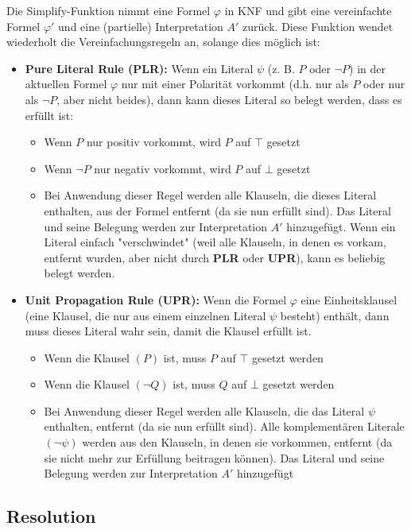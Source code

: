 \documentclass{panikzettel}
\begin{document}
Die Simplify-Funktion nimmt eine Formel $\varphi$ in KNF und gibt eine vereinfachte Formel $\varphi'$ und eine (partielle) Interpretation $A'$ zurück. Diese Funktion wendet wiederholt die Vereinfachungsregeln an, solange dies möglich ist:
\begin{itemize}
  \item \textbf{Pure Literal Rule (PLR):} Wenn ein Literal $\psi$ (z. B. $P$ oder $\neg P$) in der aktuellen Formel $\varphi$ nur mit einer Polarität vorkommt (d.h. nur als $P$ oder nur als $\neg P$, aber nicht beides), dann kann dieses Literal so belegt werden, dass es erfüllt ist:
  \begin{itemize}
    \item Wenn $P$ nur positiv vorkommt, wird $P$ auf $\top$ gesetzt
    \item Wenn $\neg P$ nur negativ vorkommt, wird $P$ auf $\bot$ gesetzt
    \item Bei Anwendung dieser Regel werden alle Klauseln, die dieses Literal enthalten, aus der Formel entfernt (da sie nun erfüllt sind). Das Literal und seine Belegung werden zur Interpretation $A'$ hinzugefügt. Wenn ein Literal einfach "verschwindet" (weil alle Klauseln, in denen es vorkam, entfernt wurden, aber nicht durch \textbf{PLR} oder \textbf{UPR}), kann es beliebig belegt werden.
  \end{itemize}
  \item \textbf{Unit Propagation Rule (UPR):} Wenn die Formel $\varphi$ eine Einheitsklausel (eine Klausel, die nur aus einem einzelnen Literal $\psi$ besteht) enthält, dann muss dieses Literal wahr sein, damit die Klausel erfüllt ist.
  \begin{itemize}
    \item Wenn die Klausel $(P)$ ist, muss $P$ auf $\top$ gesetzt werden
    \item Wenn die Klausel $(\neg Q)$ ist, muss $Q$ auf $\bot$ gesetzt werden
    \item Bei Anwendung dieser Regel werden alle Klauseln, die das Literal $\psi$ enthalten, entfernt (da sie nun erfüllt sind). Alle komplementären Literale $(\neg \psi)$ werden aus den Klauseln, in denen sie vorkommen, entfernt (da sie nicht mehr zur Erfüllung beitragen können). Das Literal und seine Belegung werden zur Interpretation $A'$ hinzugefügt
  \end{itemize}
\end{itemize}

\subsection{Resolution}
\end{document}

